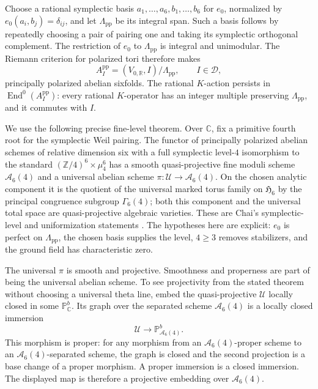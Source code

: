\documentclass[11pt]{article}
\newcommand{\C}{\mathbb C}
\newcommand{\Z}{\mathbb Z}
\newcommand{\R}{\mathbb R}
\numberwithin{equation}{section}
\begin{document}
Choose a rational symplectic basis
\(a_1,\ldots,a_6,b_1,\ldots,b_6\) for \(e_0\), normalized by
\(e_0(a_i,b_j)=\delta_{ij}\), and let \(\Lambda_{\mathrm{pp}}\)
be its integral span.  Such a basis follows by repeatedly choosing
a pair of pairing one and taking its symplectic orthogonal complement.
The restriction of \(e_0\) to \(\Lambda_{\mathrm{pp}}\) is integral
and unimodular.  The Riemann criterion for polarized tori therefore
makes
\begin{equation}
\label{p3sw:endpoint-reference-tori}
 A_I^{\mathrm{pp}}
       =(V_{0,\R},I)/\Lambda_{\mathrm{pp}},\qquad I\in\mathscr D,
\end{equation}
principally polarized abelian sixfolds.  The rational \(K\)-action
persists in \(\operatorname{End}^0(A_I^{\mathrm{pp}})\): every rational
\(K\)-operator has an integer multiple preserving
\(\Lambda_{\mathrm{pp}}\), and it commutes with \(I\).

We use the following precise fine-level theorem.  Over \(\C\), fix a
primitive fourth root for the symplectic Weil pairing.  The functor
of principally polarized abelian schemes of relative dimension six
with a full symplectic level-\(4\) isomorphism to the standard
\((\Z/4)^6\times\mu_4^6\) has a smooth quasi-projective fine moduli
scheme \(\mathscr A_6(4)\) and a universal abelian scheme
\(\pi:\mathscr U\to\mathscr A_6(4)\).  On the chosen analytic component
it is the quotient of the universal marked torus family on
\(\mathfrak H_6\) by the principal congruence subgroup
\(\Gamma_6(4)\); both this component and the universal total space
are quasi-projective algebraic varieties.  These are Chai's
symplectic-level and uniformization statements
\cite[Chapter~I, Theorems~1.4 and~1.7.2, and Sections~2.3--2.5,
pp.~5--13]{P3SWChai1985}.
The hypotheses here are explicit: \(e_0\) is perfect on
\(\Lambda_{\mathrm{pp}}\), the chosen basis supplies the level,
\(4\geq3\) removes stabilizers, and the ground field has
characteristic zero.

The universal \(\pi\) is smooth and projective.  Smoothness and
properness are part of being the universal abelian scheme.  To see
projectivity from the stated theorem without choosing a universal
theta line, embed the quasi-projective \(\mathscr U\) locally
closed in some \(\mathbb P^b_\C\).  Its graph over the separated
scheme \(\mathscr A_6(4)\) is a locally closed immersion
\[
 \mathscr U\longrightarrow\mathbb P^b_{\mathscr A_6(4)}.
\]
This morphism is proper: for any morphism from an
\(\mathscr A_6(4)\)-proper scheme to an
\(\mathscr A_6(4)\)-separated scheme, the graph is closed and the
second projection is a base change of a proper morphism.  A proper
immersion is a closed immersion.  The displayed map is therefore a
projective embedding over \(\mathscr A_6(4)\).
\end{document}
